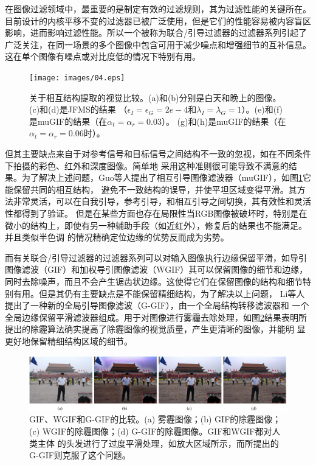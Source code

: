 在图像过滤领域中，最重要的是制定有效的过滤规则，其为过滤性能的关键所在。目前设计的内核平移不变的过滤器已被广泛使用，但是它们的性能容易被内容盲区
影响，进而影响过滤性能。所以一个被称为联合/引导过滤器的过滤器系列引起了广泛关注，在同一场景的多个图像中包含可用于减少噪点和增强细节的互补信息。
这在单个图像有噪点或对比度低的情况下特别有用。

\begin{figure}[htbp]
	\begin{center}
	    \vspace{10pt} %
		\texttt{[image: images/04.eps]}
		\caption{关于相互结构提取的视觉比较。(a)和(b)分别是白天和晚上的图像。(c)和(d)是JFMS的结果
        （$\epsilon_{I}=\epsilon_{G}=2e-4$和$\lambda_{I}=\lambda_{G}=1$）。(e)和(f)是muGIF的结果（在$\alpha_{t}=\alpha_{r}=0.03$）。
        (g)和(h)是muGIF的结果（在$\alpha_{t}=\alpha_{r}=0.06$时）。} 
		\label{04} %
	\end{center}
\end{figure}

但其主要缺点来自于对参考信号和目标信号之间结构不一致的忽视，如在不同条件下拍摄的彩色、红外和深度图像。简单地
采用这种准则很可能导致不满意的结果。为了解决上述问题，Guo等人提出了相互引导图像滤波器（muGIF）\cite{MutuallyGuided2020}，如图\ref{04}它能保留共同的相互结构，
避免不一致结构的误导，并使平坦区域变得平滑。其方法非常灵活，可以在自我引导，参考引导，和相互引导之间切换，其有效性和灵活性都得到了验证。
但是在某些方面也存在局限性当RGB图像被破坏时，特别是在微小的结构上，即使有另一种辅助手段（如近红外），修复后的结果也不能满足。并且类似半色调
的情况精确定位边缘的优势反而成为劣势。

而有关联合/引导过滤器的过滤器系列可以对输入图像执行边缘保留平滑，如导引图像滤波（GIF）和加权导引图像滤波（WGIF）其可以保留图像的细节和边缘，
同时去除噪声，而且不会产生锯齿状边缘。这使得它们在保留图像的结构和细节特别有用。但是其仍有主要缺点是不能保留精细结构，为了解决以上问题，
Li等人提出了一种新的全局引导图像滤波（G-GIF）\cite{SingleImageDeHazingUsingGloballyGuidedImageFiltering2018}，由一个全局结构转移滤波器和
一个全局边缘保留平滑滤波器组成。用于对图像进行雾霾去除处理，如图\ref{05}结果表明所提出的除霾算法确实提高了除霾图像的视觉质量，产生更清晰的图像，并能明
显更好地保留精细结构区域的细节。

\begin{figure}[htbp]
	\begin{center}
	    \vspace{10pt} %
		\includegraphics[width = 1\textwidth]{images/05.eps}
		\caption{GIF、WGIF和G-GIF的比较。(a) 雾霾图像；(b) GIF的除霾图像；(c) WGIF的除霾图像；(d) G-GIF的除霾图像。GIF和WGIF都对人类主体
        的头发进行了过度平滑处理，如放大区域所示，而所提出的G-GIF则克服了这个问题。} 
		\label{05} %
	\end{center}
\end{figure}

